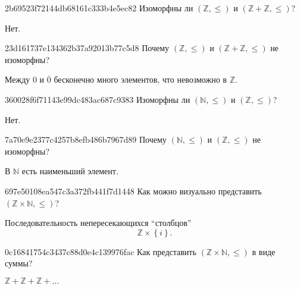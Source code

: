 \begin{note}{2b69523f72144db68161c333b4e5ec82}
    Изоморфны ли \({ (\mathbb Z, \leqslant) }\) и \({ (\mathbb Z + \mathbb Z, \leqslant) }\)?

    \begin{cloze}{1}
        Нет.
    \end{cloze}
\end{note}

\begin{note}{23d161737e134362b37a92013b77c5d8}
    Почему \({ (\mathbb Z, \leqslant) }\) и \({ (\mathbb Z + \mathbb Z, \leqslant) }\) не изоморфны?

    \begin{cloze}{1}
        Между \({ 0 }\) и \({ \overline{0} }\) бесконечно много элементов, что невозможно в \({ \mathbb Z }\).
    \end{cloze}
\end{note}

\begin{note}{360028f6f71143e99dc483ac687c9383}
    Изоморфны ли \({ (\mathbb N, \leqslant) }\) и \({ (\mathbb Z, \leqslant) }\)?

    \begin{cloze}{1}
        Нет.
    \end{cloze}
\end{note}

\begin{note}{7a70e9e2377c4257b8efb486b7967d89}
    Почему \({ (\mathbb N, \leqslant) }\) и \({ (\mathbb Z, \leqslant) }\) не изоморфны?

    \begin{cloze}{1}
        В \({ \mathbb N }\) есть наименьший элемент.
    \end{cloze}
\end{note}

\begin{note}{697e50108ea547c3a372fb441f7d1448}
    Как можно визуально представить \({ (\mathbb Z \times \mathbb N, \leqslant) }\)?

    \begin{cloze}{1}
        Последовательность непересекающихся ``столбцов''
        \[
            \mathbb Z \times \left\{ i \right\}.
        \]
    \end{cloze}
\end{note}

\begin{note}{0c16841754c3437c88d0e4c139976fac}
    Как представить \({ (\mathbb Z \times \mathbb N, \leqslant) }\) в виде суммы?

    \begin{cloze}{1}
        \({ \mathbb Z + \mathbb Z + \mathbb Z + \ldots }\)
    \end{cloze}
\end{note}

